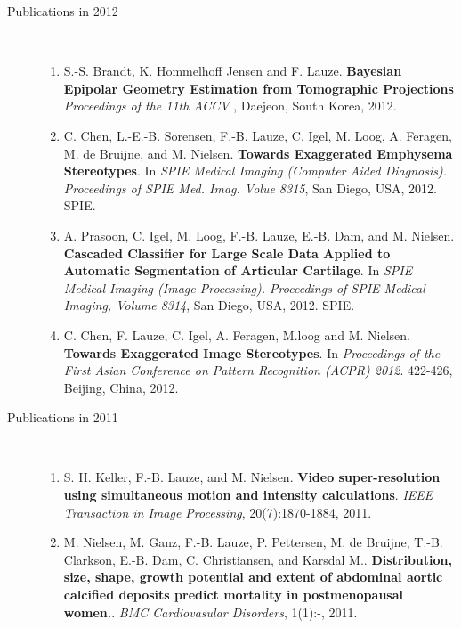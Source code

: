 \documentclass[10pt]{article}
\begin{document}
\begin{description}
\eject
\item[Publications in 2012]~\\
  \begin{enumerate}
  
  \item S.-S. Brandt, K. Hommelhoff Jensen and F. Lauze.  \textbf{Bayesian Epipolar
      Geometry Estimation from Tomographic Projections } \textit{ Proceedings of the 11th
      ACCV }, Daejeon, South Korea, 2012.

  \item C. Chen, L.-E.-B. Sorensen, F.-B. Lauze, C. Igel, M. Loog, A. Feragen, M. de
    Bruijne, and M. Nielsen.  \textbf{Towards Exaggerated Emphysema Stereotypes}.  In
    \textit{SPIE Medical Imaging (Computer Aided Diagnosis). Proceedings of SPIE
      Med. Imag. Volue 8315}, San Diego, USA, 2012.  SPIE.

  \item A. Prasoon, C. Igel, M. Loog, F.-B. Lauze, E.-B. Dam, and M. Nielsen.
    \textbf{Cascaded Classifier for Large Scale Data Applied to Automatic Segmentation of
      Articular Cartilage}.  In \textit{SPIE Medical Imaging (Image
      Processing). Proceedings of SPIE Medical Imaging, Volume 8314}, San Diego, USA,
    2012.  SPIE.

  \item C. Chen, F. Lauze, C. Igel, A. Feragen, M.loog and M. Nielsen.  \textbf{Towards
      Exaggerated Image Stereotypes}. In \textit{ Proceedings of the First Asian
      Conference on Pattern Recognition (ACPR) 2012}. 422-426, Beijing, China, 2012.

  \end{enumerate}

\item[Publications in 2011]~\\
  \begin{enumerate}
  
  \item S. H. Keller, F.-B. Lauze, and M. Nielsen.  \textbf{Video super-resolution using
      simultaneous motion and intensity calculations}.  \textit{IEEE Transaction in Image
      Processing}, 20(7):1870-1884, 2011.

  \item M. Nielsen, M. Ganz, F.-B. Lauze, P. Pettersen, M. de Bruijne, T.-B. Clarkson,
    E.-B. Dam, C. Christiansen, and Karsdal M..  \textbf{Distribution, size, shape, growth
      potential and extent of abdominal aortic calcified deposits predict mortality in
      postmenopausal women.}.  \textit{BMC Cardiovasular Disorders}, 1(1):-, 2011.


\end{enumerate}
\end{description}
\end{document}
